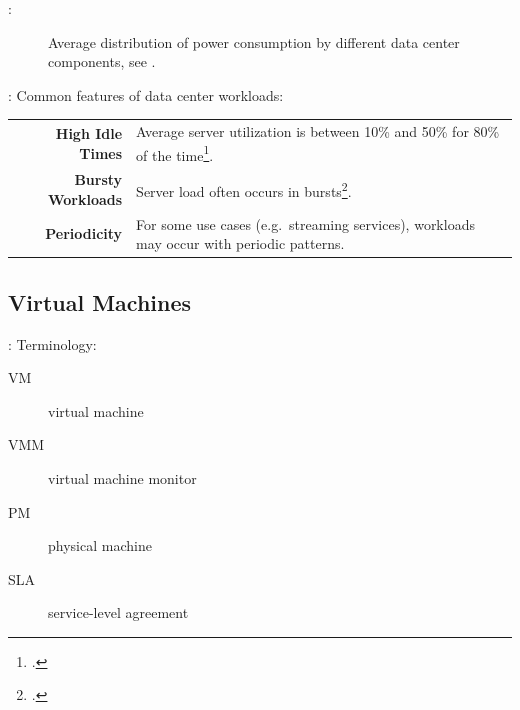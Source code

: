 \documentclass[aspectratio=169]{beamer}
\begin{document}

\begin{frame}{\insertsectionhead: \insertsubsectionhead}
    \begin{figure}
        \centering

        \caption{Average distribution of power consumption by different data center components, see \cite{masanet_estimating_2011}.}
    \end{figure}
\end{frame}


\begin{frame}{\insertsectionhead: \insertsubsectionhead}
    Common features of data center workloads:

    \begin{tabularx}{\textwidth}{rX}
        \textbf{High Idle Times} & Average server utilization is between 10\% and 50\% for 80\% of the time\footcite{barroso_epc_2007}. \\
        \textbf{Bursty Workloads} & Server load often occurs in bursts\footcite{varasteh_survey_2017}. \\
        \textbf{Periodicity} & For some use cases (e.g.\ streaming services), workloads may occur with periodic patterns. \\
    \end{tabularx}
\end{frame}
\subsection{Virtual Machines}


\begin{frame}{\insertsectionhead: \insertsubsectionhead}
    Terminology:
    \begin{description}
        \item [VM] virtual machine
        \item [VMM] virtual machine monitor
        \item [PM] physical machine
        \item [SLA] service-level agreement
    \end{description}
\end{frame}
\end{document}
